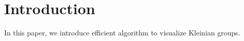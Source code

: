 
\section{Introduction}

In this paper, we introduce efficient algorithm to visualize Kleinian
groups. 

